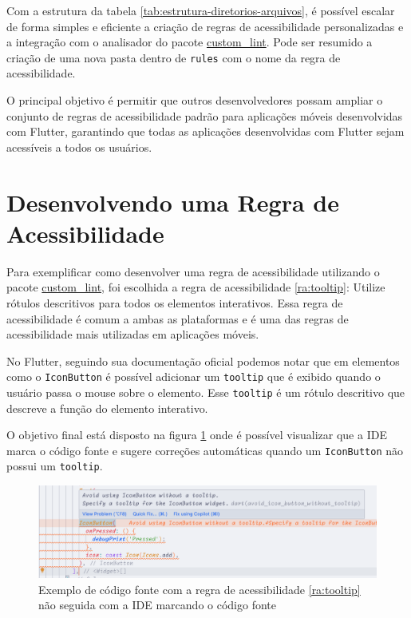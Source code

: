 Com a estrutura da tabela \ref{tab:estrutura-diretorios-arquivos}, é possível escalar de forma simples e eficiente a criação de regras de acessibilidade personalizadas e a integração com o analisador do pacote \href{https://pub.dev/packages/custom_lint}{custom\_lint}. Pode ser resumido a criação de uma nova pasta dentro de \texttt{rules} com o nome da regra de acessibilidade.

O principal objetivo é permitir que outros desenvolvedores possam ampliar o conjunto de regras de acessibilidade padrão para aplicações móveis desenvolvidas com Flutter, garantindo que todas as aplicações desenvolvidas com Flutter sejam acessíveis a todos os usuários.

\section{Desenvolvendo uma Regra de Acessibilidade}

Para exemplificar como desenvolver uma regra de acessibilidade utilizando o pacote \href{https://pub.dev/packages/custom_lint}{custom\_lint}, foi escolhida a regra de acessibilidade \ref{ra:tooltip}: Utilize rótulos descritivos para todos os elementos interativos. Essa regra de acessibilidade é comum a ambas as plataformas e é uma das regras de acessibilidade mais utilizadas em aplicações móveis.

No Flutter, seguindo sua documentação oficial \cite{flutter} podemos notar que em elementos como o \texttt{IconButton} é possível adicionar um \texttt{tooltip} que é exibido quando o usuário passa o mouse sobre o elemento. Esse \texttt{tooltip} é um rótulo descritivo que descreve a função do elemento interativo.

O objetivo final está disposto na figura \ref{fig:exemplo-codigo-fonte-tooltip} onde é possível visualizar que a IDE marca o código fonte e sugere correções automáticas quando um \texttt{IconButton} não possui um \texttt{tooltip}.

\begin{figure}[!ht]
	\centering
	\caption{Exemplo de código fonte com a regra de acessibilidade \ref{ra:tooltip} não seguida com a IDE marcando o código fonte}\label{fig:exemplo-codigo-fonte-tooltip}
	\includegraphics[width=425pt]{Assets/PrintIDEAviso.png}
\end{figure}

